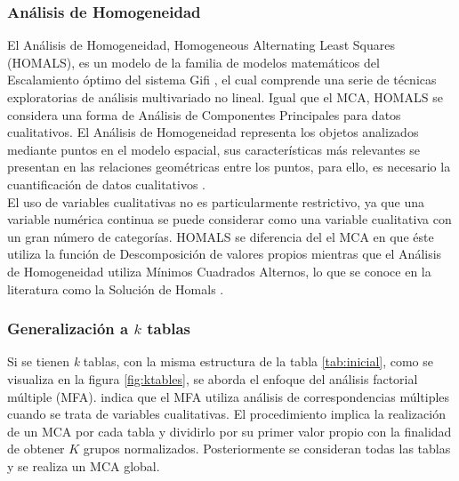 \documentclass[water,article,submit,moreauthors,pdftex]{mdpi}
\begin{document}
\hypertarget{anuxe1lisis-de-homogeneidad}{%
\subsubsection{Análisis de
Homogeneidad}\label{anuxe1lisis-de-homogeneidad}}

El Análisis de Homogeneidad, Homogeneous Alternating Least Squares
(HOMALS), es un modelo de la familia de modelos matemáticos del
Escalamiento óptimo del sistema Gifi \citep{Gifi1990}, el cual comprende
una serie de técnicas exploratorias de análisis multivariado no lineal.
Igual que el MCA, HOMALS se considera una forma de Análisis de
Componentes Principales para datos cualitativos. El Análisis de
Homogeneidad representa los objetos analizados mediante puntos en el
modelo espacial, sus características más relevantes se presentan en las
relaciones geométricas entre los puntos, para ello, es necesario la
cuantificación de datos cualitativos \citep{Lopez2014}.\\
El uso de variables cualitativas no es particularmente restrictivo, ya
que una variable numérica continua se puede considerar como una variable
cualitativa con un gran número de categorías. HOMALS se diferencia del
el MCA en que éste utiliza la función de Descomposición de valores
propios mientras que el Análisis de Homogeneidad utiliza Mínimos
Cuadrados Alternos, lo que se conoce en la literatura como la Solución
de Homals \citep{michailidis1998}.

\hypertarget{generalizaciuxf3n-a-k-tablas}{%
\subsubsection{\texorpdfstring{Generalización a \(k\)
tablas}{Generalización a k tablas}}\label{generalizaciuxf3n-a-k-tablas}}

Si se tienen \emph{k} tablas, con la misma estructura de la tabla
\ref{tab:inicial}, como se visualiza en la figura \ref{fig:ktables}, se
aborda el enfoque del análisis factorial múltiple (MFA). \citet{AFM}
indica que el MFA utiliza análisis de correspondencias múltiples cuando
se trata de variables cualitativas. El procedimiento implica la
realización de un MCA por cada tabla y dividirlo por su primer valor
propio con la finalidad de obtener \(K\) grupos normalizados.
Posteriormente se consideran todas las tablas y se realiza un MCA
global.
\end{document}
